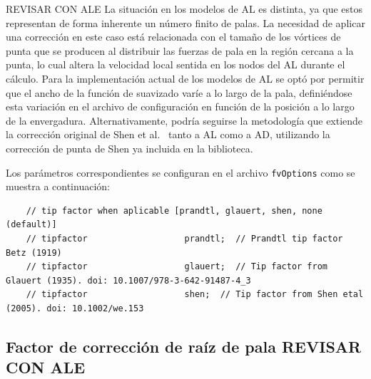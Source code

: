 {\Large REVISAR CON ALE}  La situación en los modelos de AL es distinta, ya que estos representan de forma inherente un número finito de palas. La necesidad de aplicar una corrección en este caso está relacionada con el tamaño de los vórtices de punta que se producen al distribuir las fuerzas de pala en la región cercana a la punta, lo cual altera la velocidad local sentida en los nodos del AL durante el cálculo. Para la implementación actual de los modelos de AL se optó por permitir que el ancho de la función de suavizado varíe a lo largo de la pala, definiéndose esta variación en el archivo de configuración en función de la posición a lo largo de la envergadura. Alternativamente, podría seguirse la metodología que extiende la corrección original de Shen et al.~\citep{shen2005} tanto a AL como a AD, utilizando la corrección de punta de Shen ya incluida en la biblioteca.

Los parámetros correspondientes se configuran en el archivo \texttt{fvOptions} como se muestra a continuación:

\begin{scriptsize}
\begin{verbatim}
    // tip factor when aplicable [prandtl, glauert, shen, none (default)]
    // tipfactor                   prandtl;  // Prandtl tip factor Betz (1919)
    // tipfactor                   glauert;  // Tip factor from Glauert (1935). doi: 10.1007/978-3-642-91487-4_3 
    // tipfactor                   shen;  // Tip factor from Shen etal (2005). doi: 10.1002/we.153
\end{verbatim}
\end{scriptsize}

\subsection{Factor de corrección de raíz de pala \Large REVISAR CON ALE}

